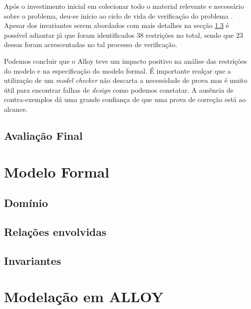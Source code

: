 \documentclass[runningheads,a4paper]{llncs}
\begin{document}
Após o investimento inicial em colecionar todo o material relevante e necessário sobre o problema, deu-se início ao ciclo de vida de verificação do problema \cite{jno}. Apesar dos invariantes serem abordados com mais detalhes na secção \ref{SubSecInv} é possível adiantar já que foram identificados 38 restrições no total, sendo que 23 dessas foram acrescentadas no tal processo de verificação.

Podemos concluir que o Alloy teve um impacto positivo na análise das restrições do modelo e na especificação do modelo formal. É importante realçar que a utilização de um \textit{model checker} não descarta a necessidade de prova mas é muito útil para encontrar falhas de \textit{design} como podemos constatar. A ausência de contra-exemplos dá uma grande confiança de que uma prova de correção está ao alcance.

\subsection{Avaliação Final}

\section{Modelo Formal} \label{SecModel}

\subsection{Domínio}


\subsection{Relações envolvidas}


\subsection{Invariantes} \label{SubSecInv}


\section{Modelação em ALLOY} \label{SecAlloy}
\end{document}
